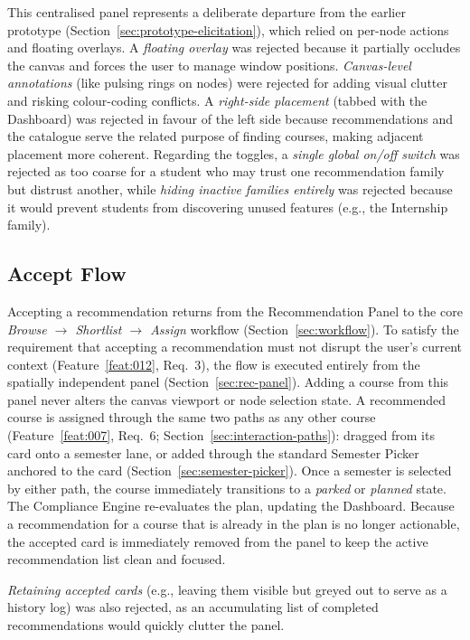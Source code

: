 This centralised panel represents a deliberate departure from the earlier prototype (Section~\ref{sec:prototype-elicitation}), which relied on per-node actions and floating overlays. A \emph{floating overlay} was rejected because it partially occludes the canvas and forces the user to manage window positions. \emph{Canvas-level annotations} (like pulsing rings on nodes) were rejected for adding visual clutter and risking colour-coding conflicts. A \emph{right-side placement} (tabbed with the Dashboard) was rejected in favour of the left side because recommendations and the catalogue serve the related purpose of finding courses, making adjacent placement more coherent. Regarding the toggles, a \emph{single global on/off switch} was rejected as too coarse for a student who may trust one recommendation family but distrust another, while \emph{hiding inactive families entirely} was rejected because it would prevent students from discovering unused features (e.g., the Internship family).

\subsection{Accept Flow}
\label{sec:rec-accept}

Accepting a recommendation returns from the Recommendation Panel to the core \emph{Browse $\to$ Shortlist $\to$ Assign} workflow (Section~\ref{sec:workflow}). To satisfy the requirement that accepting a recommendation must not disrupt the user's current context (Feature~\ref{feat:012}, Req.~3), the flow is executed entirely from the spatially independent panel (Section~\ref{sec:rec-panel}). Adding a course from this panel never alters the canvas viewport or node selection state. 
A recommended course is assigned through the same two paths as any other course (Feature~\ref{feat:007}, Req.~6; Section~\ref{sec:interaction-paths}): dragged from its card onto a semester lane, or added through the standard Semester Picker anchored to the card (Section~\ref{sec:semester-picker}). Once a semester is selected by either path, the course immediately transitions to a \emph{parked} or \emph{planned} state. The Compliance Engine re-evaluates the plan, updating the Dashboard. Because a recommendation for a course that is already in the plan is no longer actionable, the accepted card is immediately removed from the panel to keep the active recommendation list clean and focused.

\emph{Retaining accepted cards} (e.g., leaving them visible but greyed out to serve as a history log) was also rejected, as an accumulating list of completed recommendations would quickly clutter the panel.